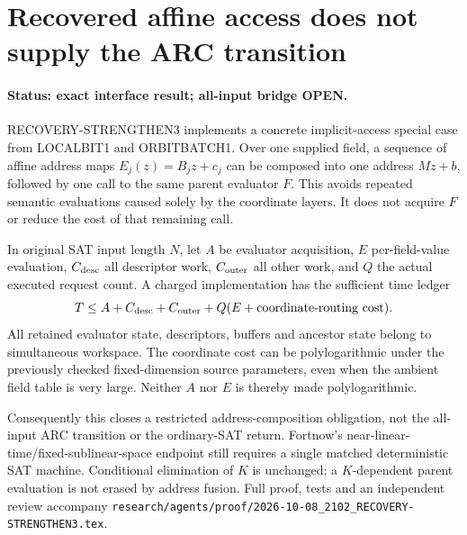 \section{Recovered affine access does not supply the ARC transition}
\label{sec:recovery-strengthen3-arc}
\paragraph{Status: exact interface result; all-input bridge OPEN.}
RECOVERY-STRENGTHEN3 implements a concrete implicit-access special case
from LOCALBIT1 and ORBITBATCH1. Over one supplied field, a sequence of
affine address maps $E_j(z)=B_jz+c_j$ can be composed into one address
$Mz+b$, followed by one call to the same parent evaluator $F$. This
avoids repeated semantic evaluations caused solely by the coordinate
layers. It does not acquire $F$ or reduce the cost of that remaining call.

In original SAT input length $N$, let $A$ be evaluator acquisition,
$E$ per-field-value evaluation, $C_{\rm desc}$ all descriptor work,
$C_{\rm outer}$ all other work, and $Q$ the actual executed request
count. A charged implementation has the sufficient time ledger
\[
 T\le A+C_{\rm desc}+C_{\rm outer}
       +Q(E+\hbox{coordinate-routing cost}).
\]
All retained evaluator state, descriptors, buffers and ancestor state
belong to simultaneous workspace. The coordinate cost can be
polylogarithmic under the previously checked fixed-dimension source
parameters, even when the ambient field table is very large. Neither
$A$ nor $E$ is thereby made polylogarithmic.

Consequently this closes a restricted address-composition obligation,
not the all-input ARC transition or the ordinary-SAT return. Fortnow's
near-linear-time/fixed-sublinear-space endpoint still requires a single
matched deterministic SAT machine. Conditional elimination of $K$ is
unchanged; a $K$-dependent parent evaluation is not erased by address
fusion. Full proof, tests and an independent review accompany
\nolinkurl{research/agents/proof/2026-10-08_2102_RECOVERY-STRENGTHEN3.tex}.

